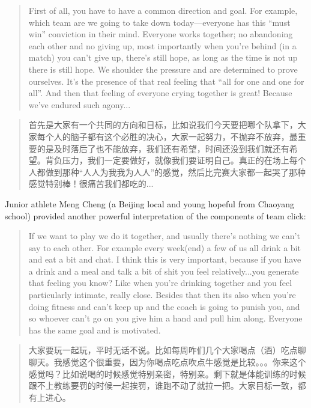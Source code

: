 \begin{CJK}{UTF8}{gbsn}
    \begin{quotation}
      First of all, you have to have a common direction and goal.  For example, which team are we going to take down today---everyone has this ``must win'' conviction in their mind.  Everyone works together; no abandoning each other and no giving up, most importantly when you’re behind (in a match) you can’t give up, there’s still hope, as long as the time is not up there is still hope.  We shoulder the pressure and are determined to prove ourselves.  It's the presence of that real feeling that ``all for one and one for all''.  And then that feeling of everyone crying together is great! Because we've endured such agony...
    \end{quotation}

    \begin{quotation}
      首先是大家有一个共同的方向和目标，比如说我们今天要把哪个队拿下，大家每个人的脑子都有这个必胜的决心，大家一起努力，不抛弃不放弃，最重要的是及时落后了也不能放弃，我们还有希望，时间还没到我们就还有希望。背负压力，我们一定要做好，就像我们要证明自己。真正的在场上每个人都做到那种“人人为我我为人人”的感觉，然后比完赛大家都一起哭了那种感觉特别棒！很痛苦我们都吃的...
    \end{quotation}


Junior athlete Meng Cheng (a Beijing local and young hopeful from Chaoyang school) provided another powerful interpretation of the components of team click:

      \begin{quotation}
        If we want to play we do it together, and usually there’s nothing we can’t say to each other. For example every week(end) a few of us all drink a bit and eat a bit and chat.  I think this is very important, because if you have a drink and a meal and talk a bit of shit you feel relatively...you generate that feeling you know? Like when you’re drinking together and you feel particularly intimate, really close.  Besides that then its also when you’re doing fitness and can’t keep up and the coach is going to punish you, and so whoever can’t go on you give him a hand and pull him along.  Everyone has the same goal and is motivated.
      \end{quotation}

      \begin{quotation}
        大家要玩一起玩，平时无话不说。比如每周咋们几个大家喝点（酒）吃点聊聊天。我感觉这个很重要，因为你喝点吃点吹点牛感觉是比较。。。你来这个感觉吗？比如说喝的时候感觉特别亲密，特别亲。剩下就是体能训练的时候跟不上教练要罚的时候一起挨罚，谁跑不动了就拉一把。大家目标一致，都有上进心。 
      \end{quotation}



\end{CJK}
